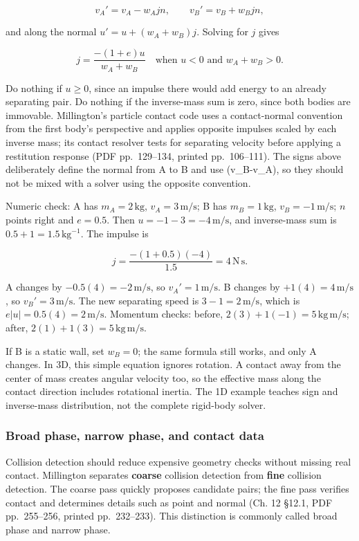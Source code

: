 \[
v_A'=v_A-w_A j n,\qquad v_B'=v_B+w_B j n,
\]

and along the normal \(u'=u+(w_A+w_B)j\). Solving for \(j\) gives

\[
j=\frac{-(1+e)u}{w_A+w_B}\quad\text{when }u<0\text{ and }w_A+w_B>0.
\]

Do nothing if \(u\ge0\), since an impulse there would add energy to an already separating pair. Do nothing if the inverse-mass sum is zero, since both bodies are immovable. Millington's particle contact code uses a contact-normal convention from the first body's perspective and applies opposite impulses scaled by each inverse mass; its contact resolver tests for separating velocity before applying a restitution response (PDF pp.~129--134, printed pp.~106--111). The signs above deliberately define the normal from A to B and use (v\_B-v\_A), so they should not be mixed with a solver using the opposite convention.

Numeric check: A has \(m_A=2\,\mathrm{kg}\), \(v_A=3\,\mathrm{m/s}\); B has \(m_B=1\,\mathrm{kg}\), \(v_B=-1\,\mathrm{m/s}\); \(n\) points right and \(e=0.5\). Then \(u=-1-3=-4\,\mathrm{m/s}\), and inverse-mass sum is \(0.5+1=1.5\,\mathrm{kg^{-1}}\). The impulse is

\[
j=\frac{-(1+0.5)(-4)}{1.5}=4\,\mathrm{N\,s}.
\]

A changes by \(-0.5(4)=-2\,\mathrm{m/s}\), so \(v_A'=1\,\mathrm{m/s}\). B changes by \(+1(4)=4\,\mathrm{m/s}\), so \(v_B'=3\,\mathrm{m/s}\). The new separating speed is \(3-1=2\,\mathrm{m/s}\), which is \(e|u|=0.5(4)=2\,\mathrm{m/s}\). Momentum checks: before, \(2(3)+1(-1)=5\,\mathrm{kg\,m/s}\); after, \(2(1)+1(3)=5\,\mathrm{kg\,m/s}\).

If B is a static wall, set \(w_B=0\); the same formula still works, and only A changes. In 3D, this simple equation ignores rotation. A contact away from the center of mass creates angular velocity too, so the effective mass along the contact direction includes rotational inertia. The 1D example teaches sign and inverse-mass distribution, not the complete rigid-body solver.

\subsubsection{Broad phase, narrow phase, and contact data}\label{06-engine-ii-ch033-broad-phase-narrow-phase-and-contact-data}

Collision detection should reduce expensive geometry checks without missing real contact. Millington separates \textbf{coarse} collision detection from \textbf{fine} collision detection. The coarse pass quickly proposes candidate pairs; the fine pass verifies contact and determines details such as point and normal (Ch. 12 §12.1, PDF pp.~255--256, printed pp.~232--233). This distinction is commonly called broad phase and narrow phase.

